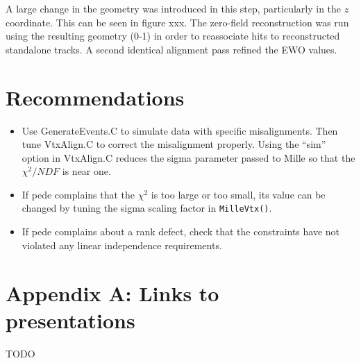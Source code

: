 \documentclass[12pt]{article}
\begin{document}
A large change in the geometry was introduced in this step, particularly in the $z$ coordinate. This can be seen in figure xxx. The zero-field reconstruction was run using the resulting geometry (0-1) in order to reassociate hits to reconstructed standalone tracks. A second identical alignment pass refined the EWO values.


\section{Recommendations}
\begin{itemize}
  \item Use GenerateEvents.C to simulate data with specific misalignments. Then tune VtxAlign.C to correct the misalignment properly. Using the ``sim'' option in VtxAlign.C reduces the sigma parameter passed to Mille so that the $\chi^2/NDF$ is near one.
  \item If pede complains that the $\chi^2$ is too large or too small, its value can be changed by tuning the sigma scaling factor in \texttt{MilleVtx()}.
  \item If pede complains about a rank defect, check that the constraints have not violated any linear independence requirements. 
\end{itemize}
\section{Appendix A: Links to presentations}
TODO
\end{document}
